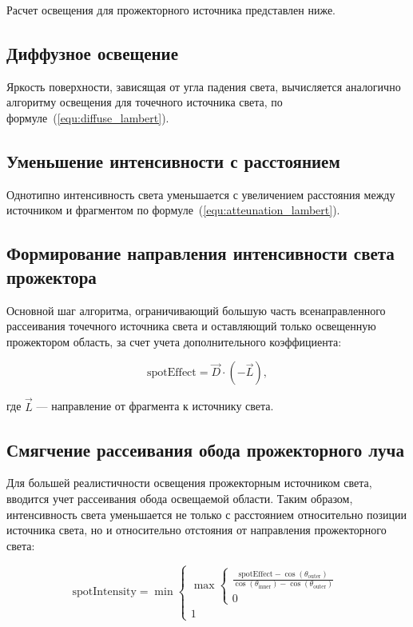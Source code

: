 Расчет освещения для прожекторного источника представлен ниже.

\subsection*{Диффузное освещение}

Яркость поверхности, зависящая от угла падения света, вычисляется аналогично
алгоритму освещения для точечного источника света, по формуле~(\ref{equ:diffuse_lambert}).

\subsection*{Уменьшение интенсивности с расстоянием}

Однотипно интенсивность света уменьшается с увеличением расстояния между источником и фрагментом
по формуле~(\ref{equ:atteunation_lambert}).

\subsection*{Формирование направления интенсивности света прожектора}

Основной шаг алгоритма, ограничивающий большую часть всенаправленного
рассеивания точечного источника света и оставляющий только освещенную
прожектором область, за счет учета дополнительного коэффициента:

\begin{equation}
    \label{equ:spot_effect_lambert}
    \text{spotEffect} = \vec{D} \cdot (-\vec{L}),
\end{equation}

\noindent где \( \vec{L} \) — направление от фрагмента к источнику света.

\subsection*{Смягчение рассеивания обода прожекторного луча}

Для большей реалистичности освещения прожекторным источником света,
вводится учет рассеивания обода освещаемой области. Таким образом,
интенсивность света уменьшается не только с расстоянием относительно
позиции источника света, но и относительно отстояния от направления
прожекторного света:

\begin{equation}
    \label{equ:spot_intensity_lambert}
    \text{spotIntensity} = \min
    \begin{cases}
        \max
        \begin{cases}
            \frac{\text{spotEffect} - \cos(\theta_{\text{outer}})}{\cos(\theta_{\text{inner}}) - \cos(\theta_{\text{outer}})} \\
            0
        \end{cases} \\
        1
    \end{cases}
\end{equation}

